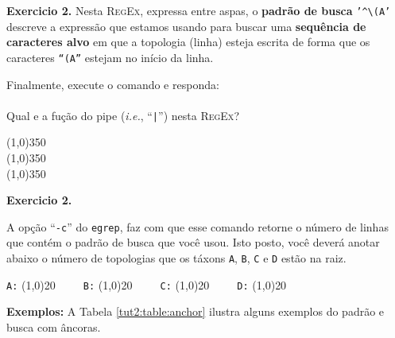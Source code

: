 \begin{refsection}
\begin{blackBlock}{\textbf{Exercicio 2.}}
Nesta \textsc{RegEx}, expressa entre aspas, o \textbf{padrão de busca} \texttt{'\^{}\textbackslash (A'} descreve a expressão que estamos usando para buscar uma \textbf{sequência de caracteres alvo} em que a topologia (linha) esteja escrita de forma que os caracteres \texttt{``(A''} estejam no início da linha.

Finalmente, execute o comando e responda:\\
\\

Qual e a fução do pipe (\textit{i.e.}, ``\texttt{|}'') nesta \textsc{RegEx}?

\begin{center}
\line(1,0){350}\\
\line(1,0){350}\\
\line(1,0){350}\\
\end{center}

\end{blackBlock}

\vspace{15pt}

\begin{blackBlock}{\textbf{Exercicio 2.}}\label{tut2:ex:9.\arabic{ex}}

A opção ``\texttt{-c}'' do \texttt{egrep}, faz com que esse comando retorne o número de linhas que contém o padrão de busca que você usou. Isto posto, você deverá anotar abaixo o número de topologias que os táxons \texttt{A}, \texttt{B}, \texttt{C} e \texttt{D} estão na raiz.\\

\begin{center}
\texttt{A:} \line(1,0){20}~~~~~\texttt{B:} \line(1,0){20}~~~~~\texttt{C:} \line(1,0){20}~~~~~\texttt{D:} \line(1,0){20} \\
\end{center}

\end{blackBlock}

\vspace{15pt}

\textbf{Exemplos:} A Tabela \ref{tut2:table:anchor} ilustra alguns exemplos do padrão e busca com âncoras.

\pagestyle{fancy}
\begin{center}


\end{center}
\end{refsection}
